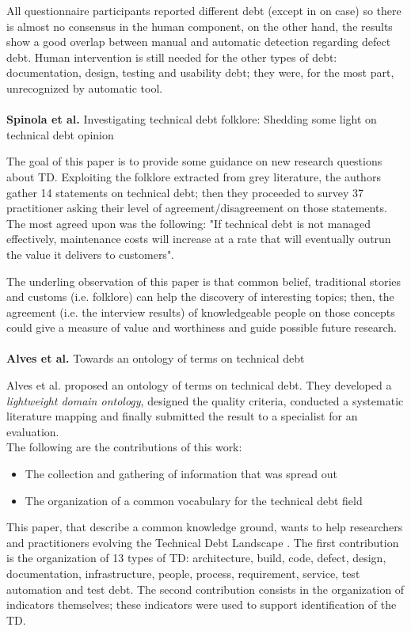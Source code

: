 All questionnaire participants reported different debt (except in on case) so there is almost no consensus in the human component, on the other hand, the results show a good overlap between manual and automatic detection regarding defect debt. Human intervention is still needed for the other types of debt: documentation, design, testing and usability debt; they were, for the most part, unrecognized by automatic tool.
\\
\\
\textbf{Spinola et al.} \cite{spinola2013investigating} Investigating technical debt folklore: Shedding some light on technical debt opinion

The goal of this paper is to provide some guidance on new research questions about TD. Exploiting the folklore extracted from grey literature, the authors gather 14 statements on technical debt; then they proceeded to survey 37 practitioner asking their level of agreement/disagreement on those statements. The most agreed upon was the following: "If technical debt is not managed effectively, maintenance costs will increase at a rate that will eventually outrun the value it delivers to customers".

The underling observation of this paper is that common belief, traditional stories and customs (i.e. folklore) can help the discovery of interesting topics; then, the agreement (i.e. the interview results) of knowledgeable people on those concepts could give a measure of value and worthiness and guide possible future research.
\\
\\
\textbf{Alves et al.} \cite{alves2014towards} Towards an ontology of terms on technical debt

Alves et al. proposed an ontology of terms on technical debt. They developed a \emph{lightweight domain ontology}, designed the quality criteria, conducted a systematic literature mapping and finally submitted the result to a specialist for an evaluation.
\\
The following are the contributions of this work:
\begin{itemize}
    \item The collection and gathering of information that was spread out
    \item The organization of a common vocabulary for the technical debt field 
\end{itemize}
This paper, that describe a common knowledge ground, wants to help researchers and practitioners evolving the Technical Debt Landscape \cite{izurieta2012organizing}.
The first contribution is the organization of 13 types of TD: architecture, build, code, defect, design, documentation, infrastructure, people, process, requirement, service, test automation and test debt.
The second contribution consists in the organization of indicators themselves; these indicators were used to support identification of the TD.
\\
\\
